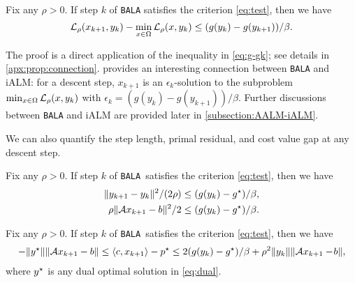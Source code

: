 \documentclass[11pt]{article}
\newcommand{\alg}{\texttt{BALA}}%
\begin{document}
\begin{lemma}
    \label{prop:connection}
    Fix any $\rho > 0$. If step $k$ of \alg{} satisfies the criterion \cref{eq:test}, then we have
    \begin{equation*}
        \mathcal{L}_{\rho}(x_{k+1},y_k) - \min_{x \in \Omega} \mathcal{L}_{\rho}(x,y_k)\leq (g(y_k) - g(y_{k+1}))/\beta.
    \end{equation*}
\end{lemma}

The proof is a direct application of the inequality in \cref{eq:g-gk}; see details in \cref{apx:prop:connection}.  provides an interesting connection between \alg{} and iALM: for a descent step, $x_{k+1}$ is an $\epsilon_k$-solution to the subproblem $\min_{x \in \Omega} \mathcal{L}_{\rho}(x,y_k)$ with $\epsilon_k = (g(y_k) - g(y_{k+1}))/\beta$. Further discussions between \alg{} and iALM are provided later in \cref{subsection:AALM-iALM}.

We can also quantify the step length, primal residual, and cost value gap at any descent step. 
\begin{lemma}
    \label{lemma:bundle-dual-consecutive}
       Fix any $\rho > 0$. If step $k$ of \alg~satisfies the criterion \cref{eq:test}, then we have 
     \begin{subequations}
    \begin{align}
          \|y_{k+1} - y_k\|^2/(2\rho)    &\leq (g(y_{k})-g^\star)/\beta, \label{eq:bound-dual} \\
         \rho \| \mathcal{A} x_{k+1} - b\|^2/2 & \leq  (g(y_{k}) - g^\star)/\beta.
        \label{eq:bound-affine}
    \end{align}
     \end{subequations}
\end{lemma}

\begin{lemma}
    \label{lemma:cost-value}
     Fix any $\rho > 0$. If step $k$ of \alg~satisfies the criterion \cref{eq:test}, then we have 
    \begin{align*}
        -\|y^\star\|\|\mathcal{A} x_{k+1} -  b\| \leq \left \langle c, x_{k+1} \right\rangle - p^\star  
          \leq   2   (g(y_k) - g^\star)/\beta   + \rho^2 \|y_k\|  \|\mathcal{A} x_{k+1} - \!b\|,
    \end{align*}
        where $y^\star$ is any dual optimal solution in \eqref{eq:dual}.
\end{lemma}
\end{document}
